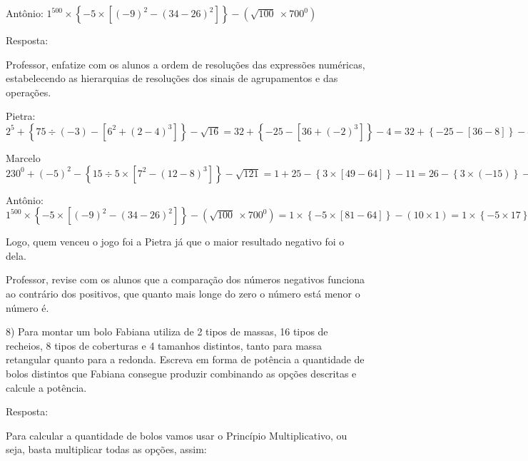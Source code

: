 Antônio:
\(1^{500} \times \left\{ - 5 \times \left\lbrack \left( - 9 \right)^{2} - \left( 34 - 26 \right)^{2} \right\rbrack \right\} - (\sqrt{100}\  \times 700^{0})\)

Resposta:

Professor, enfatize com os alunos a ordem de resoluções das expressões
numéricas, estabelecendo as hierarquias de resoluções dos sinais de
agrupamentos e das operações.

Pietra:\\
\(2^{5} + \left\{ 75 \div \left( - 3 \right) - \left\lbrack 6^{2} + \left( 2 - 4 \right)^{3} \right\rbrack \right\} - \sqrt{16} = 32 + \left\{ - 25 - \left\lbrack 36 + \left( - 2 \right)^{3} \right\rbrack \right\} - 4 = 32 + \left\{ - 25 - \left\lbrack 36 - 8 \right\rbrack \right\} - 4 = 32 + \left\{ - 25 - 28 \right\} - 4 = 32 - 53 - 4 = - 25\)

Marcelo\\
\(230^{0} + \left( - 5 \right)^{2} - \left\{ 15 \div 5 \times \left\lbrack 7^{2} - \left( 12 - 8 \right)^{3} \right\rbrack \right\} - \sqrt{121} = 1 + 25 - \left\{ 3 \times \left\lbrack 49 - 64 \right\rbrack \right\} - 11 = 26 - \left\{ 3 \times \left( - 15 \right) \right\} - 11 = 26 - \left\{ - 45 \right\} - 11 = 26 + 45 - 11 = 60\)

Antônio:
\(1^{500} \times \left\{ - 5 \times \left\lbrack \left( - 9 \right)^{2} - \left( 34 - 26 \right)^{2} \right\rbrack \right\} - \left( \sqrt{100}\  \times 700^{0} \right) = 1 \times \left\{ - 5 \times \left\lbrack 81 - 64 \right\rbrack \right\} - \left( 10 \times 1 \right) = 1 \times \left\{ - 5 \times 17 \right\} - 10 = 1 \times \left( - 85 \right) - 10 = - 85 - 10 = - 95\)

Logo, quem venceu o jogo foi a Pietra já que o maior resultado negativo
foi o dela.

Professor, revise com os alunos que a comparação dos números negativos
funciona ao contrário dos positivos, que quanto mais longe do zero o
número está menor o número é.

8) Para montar um bolo Fabiana utiliza de 2 tipos de massas, 16 tipos de
recheios, 8 tipos de coberturas e 4 tamanhos distintos, tanto para massa
retangular quanto para a redonda. Escreva em forma de potência a
quantidade de bolos distintos que Fabiana consegue produzir combinando
as opções descritas e calcule a potência.

Resposta:

Para calcular a quantidade de bolos vamos usar o Princípio
Multiplicativo, ou seja, basta multiplicar todas as opções, assim:

